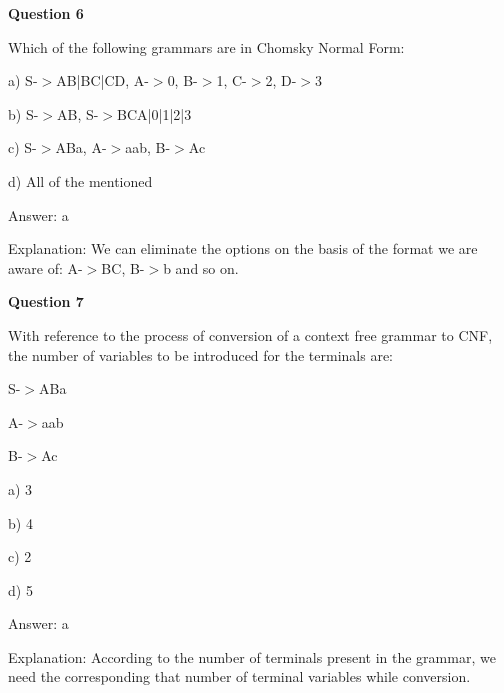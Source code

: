 \documentclass{article}
\begin{document}
\begin{mdframed}[linewidth=1pt, roundcorner=5pt, linecolor=gray!30, backgroundcolor=gray!5]
\textbf{Question 6} 

Which of the following grammars are in Chomsky Normal Form:

a) S-$>$AB|BC|CD, A-$>$0, B-$>$1, C-$>$2, D-$>$3

b) S-$>$AB, S-$>$BCA|0|1|2|3

c) S-$>$ABa, A-$>$aab, B-$>$Ac

d) All of the mentioned
\vspace{5pt} \par
\begin{tcolorbox}[colback=green!5, colframe=green!40!black, title=Solution]
Answer: a

Explanation: We can eliminate the options on the basis of the format we are aware of: A-$>$BC, B-$>$b and so on.
\end{tcolorbox}
\end{mdframed}
\newpage

\begin{mdframed}[linewidth=1pt, roundcorner=5pt, linecolor=gray!30, backgroundcolor=gray!5]
\textbf{Question 7} 

With reference to the process of conversion of a context free grammar to CNF, the number of variables to be introduced for the terminals are:

S-$>$ABa

A-$>$aab

B-$>$Ac

a) 3

b) 4

c) 2

d) 5
\vspace{5pt} \par
\begin{tcolorbox}[colback=green!5, colframe=green!40!black, title=Solution]
Answer: a

Explanation: According to the number of terminals present in the grammar, we need the corresponding that number of terminal variables while conversion.
\end{tcolorbox}
\end{mdframed}
\
\end{document}
